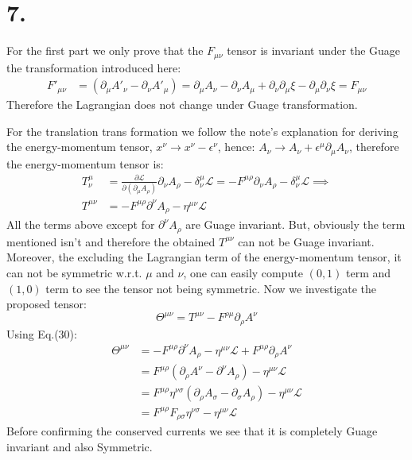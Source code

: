 \documentclass{article}
\newcommand{\pd}{\partial}  %
\newcommand{\pdm}{\partial_\mu}  %
\newcommand{\pdn}{\partial_\nu}  %
\newcommand{\pdupnu}{\partial^\nu}  %
\newcommand{\Lag}{\mathcal{L}}  %
\begin{document}
\section*{7.}
For the first part we only prove that the $F_{\mu\nu}$ tensor is invariant under the Guage the transformation
introduced here:
\begin{equation}
    \begin{split}
        F'_{\mu\nu} & = (\pdm A'_\nu - \pdn A'_\mu) = \pdm A_\nu - \pdn A_\mu + \pdn \pdm \xi - \pdm\pdn \xi = F_{\mu\nu}
    \end{split}
\end{equation}
Therefore the Lagrangian does not change under Guage transformation.

For the translation trans formation we follow the note's explanation for deriving the energy-momentum tensor,
$x^\nu \xrightarrow{} x^\nu - \epsilon^\nu$, hence: $A_\nu \xrightarrow{} A_\nu + \epsilon^\mu \pdm A_\nu $,
 therefore the energy-momentum tensor is:
 \begin{equation}
    \begin{split}
        T^\mu_\nu &= \frac{\pd\Lag}{\pd (\pdm A_\rho)}\pdn A_\rho - \delta^\mu_\nu \Lag = -F^{\mu\rho}\pdn A_\rho - \delta^\mu_\nu \Lag \implies \\
        T^{\mu\nu} & = -F^{\mu\rho}\pdupnu A_\rho - \eta^{\mu\nu}\Lag
    \end{split}
 \end{equation}
All the terms above except for $\pdupnu A_\rho$ are Guage invariant. But, obviously the term mentioned isn't and therefore
the obtained $T^{\mu\nu}$ can not be Guage invariant. Moreover, the excluding the Lagrangian term of the 
energy-momentum tensor, it can not be symmetric w.r.t. $\mu$ and $\nu$, one can easily compute $(0,1)$ term and 
$(1,0)$ term to see the tensor not being symmetric.
Now we investigate the proposed tensor:
\begin{equation}
    \Theta^{\mu\nu} = T^{\mu\nu}-F^{\rho\mu}\pd_{\rho}A^\nu
\end{equation}
Using Eq.(30):
\begin{equation}
    \begin{split}
        \Theta^{\mu\nu} &= -F^{\mu\rho}\pdupnu A_\rho - \eta^{\mu\nu}\Lag + F^{\mu\rho}\pd_\rho A^\nu \\
        & = F^{\mu\rho}(\pd_\rho A^\nu - \pdupnu A_\rho) - \eta^{\mu\nu}\Lag \\
        & = F^{\mu\rho}\eta^{\nu\sigma}(\pd_\rho A_\sigma - \pd_\sigma A_\rho) - \eta^{\mu\nu}\Lag \\
        & = F^{\mu\rho}F_{\rho\sigma}\eta^{\nu\sigma} - \eta^{\mu\nu}\Lag 
    \end{split}
\end{equation}
Before confirming the conserved currents we see that it is completely Guage invariant and also Symmetric.
\end{document}
